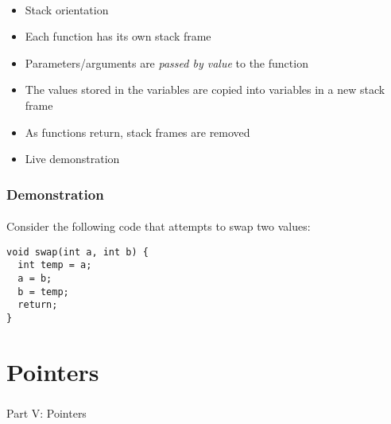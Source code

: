 \documentclass[]{beamer}
\begin{document}
\begin{frame}
\begin{minipage}[c]{0.50\linewidth}

\end{minipage}~~~~~~\begin{minipage}[c]{0.35\linewidth}
\begin{itemize}[<+->]
  \item Stack orientation
  \item Each function has its own stack frame
  \item Parameters/arguments are \emph{passed by value} to the function
  \item The values stored in the variables are copied into variables in a new
  stack frame
  \item As functions return, stack frames are removed
  \item Live demonstration
\end{itemize}
\end{minipage}


\end{frame}

\begin{frame}[fragile]
  \frametitle{Demonstration}
  \framesubtitle{}
  
Consider the following code that attempts to swap two values:
\begin{verbatim}
void swap(int a, int b) {
  int temp = a;
  a = b;
  b = temp;
  return;
}
\end{verbatim}


\end{frame}

\section{Pointers}

\begin{frame}
    \frametitle{}
    \framesubtitle{}
    
    \begin{center}
    {\Huge Part V: Pointers}\\
    {\Large ~}
    \end{center}

\end{frame}
\end{document}
